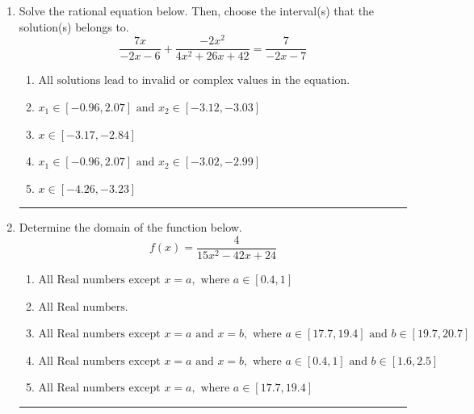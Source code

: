 \documentclass[14pt]{extbook}
\newcommand{\litem}[1]{\item#1\hspace*{-1cm}\rule{\textwidth}{0.4pt}}
\begin{document}
\begin{enumerate}
\litem{
Solve the rational equation below. Then, choose the interval(s) that the solution(s) belongs to.\[ \frac{7x}{-2x -6} + \frac{-2x^{2}}{4x^{2} +26 x + 42} = \frac{7}{-2x -7} \]\begin{enumerate}[label=\Alph*.]
\item \( \text{All solutions lead to invalid or complex values in the equation.} \)
\item \( x_1 \in [-0.96, 2.07] \text{ and } x_2 \in [-3.12,-3.03] \)
\item \( x \in [-3.17,-2.84] \)
\item \( x_1 \in [-0.96, 2.07] \text{ and } x_2 \in [-3.02,-2.99] \)
\item \( x \in [-4.26,-3.23] \)

\end{enumerate} }
\litem{
Determine the domain of the function below.\[ f(x) = \frac{4}{15x^{2} -42 x + 24} \]\begin{enumerate}[label=\Alph*.]
\item \( \text{All Real numbers except } x = a, \text{ where } a \in [0.4, 1] \)
\item \( \text{All Real numbers.} \)
\item \( \text{All Real numbers except } x = a \text{ and } x = b, \text{ where } a \in [17.7, 19.4] \text{ and } b \in [19.7, 20.7] \)
\item \( \text{All Real numbers except } x = a \text{ and } x = b, \text{ where } a \in [0.4, 1] \text{ and } b \in [1.6, 2.5] \)
\item \( \text{All Real numbers except } x = a, \text{ where } a \in [17.7, 19.4] \)


\end{enumerate}}
\end{enumerate}
\end{document}
